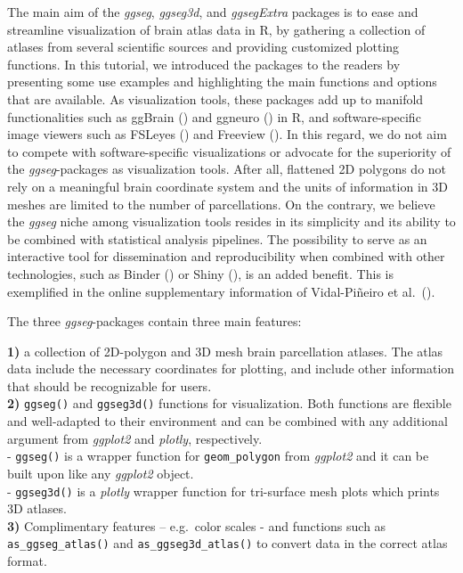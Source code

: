 \documentclass[fleqn,10pt]{wlpeerj} %
\begin{document}
The main aim of the \emph{ggseg}, \emph{ggseg3d}, and \emph{ggsegExtra} packages is to ease and streamline visualization of brain atlas data in R, by gathering a collection of atlases from several scientific sources and providing customized plotting functions.
In this tutorial, we introduced the packages to the readers by presenting some use examples and highlighting the main functions and options that are available.
As visualization tools, these packages add up to manifold functionalities such as ggBrain (\citet{ggBrain}) and ggneuro (\citet{ggneuro}) in R, and software-specific image viewers such as FSLeyes (\citet{fsleyes}) and Freeview (\citet{dale_99}).
In this regard, we do not aim to compete with software-specific visualizations or advocate for the superiority of the \emph{ggseg}-packages as visualization tools.
After all, flattened 2D polygons do not rely on a meaningful brain coordinate system and the units of information in 3D meshes are limited to the number of parcellations.
On the contrary, we believe the \emph{ggseg} niche among visualization tools resides in its simplicity and its ability to be combined with statistical analysis pipelines.
The possibility to serve as an interactive tool for dissemination and reproducibility when combined with other technologies, such as Binder (\citet{binder}) or Shiny (\citet{shiny}), is an added benefit.
This is exemplified in the online supplementary information of Vidal-Piñeiro et al.~(\citeyearpar{vidal_2019}).

The three \emph{ggseg}-packages contain three main features:

\textbf{1)} a collection of 2D-polygon and 3D mesh brain parcellation atlases. The atlas data include the necessary coordinates for plotting, and include other information that should be recognizable for users.\\
\textbf{2)} \texttt{ggseg()} and \texttt{ggseg3d()} functions for visualization. Both functions are flexible and well-adapted to their environment and can be combined with any additional argument from \emph{ggplot2} and \emph{plotly}, respectively.\\
- \texttt{ggseg()} is a wrapper function for \texttt{geom\_polygon} from \emph{ggplot2} and it can be built upon like any \emph{ggplot2} object.\\
- \texttt{ggseg3d()} is a \emph{plotly} wrapper function for tri-surface mesh plots which prints 3D atlases.\\
\textbf{3)} Complimentary features -- e.g.~color scales - and functions such as \texttt{as\_ggseg\_atlas()} and \texttt{as\_ggseg3d\_atlas()} to convert data in the correct atlas format.
\end{document}
